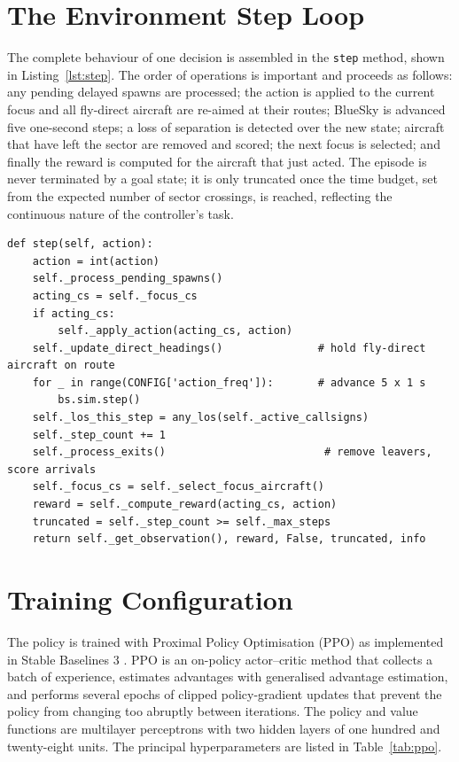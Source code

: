 \section{The Environment Step Loop}
\label{sec:method_step}

The complete behaviour of one decision is assembled in the \texttt{step} method, shown in Listing~\ref{lst:step}. The order of operations is important and proceeds as follows: any pending delayed spawns are processed; the action is applied to the current focus and all fly-direct aircraft are re-aimed at their routes; BlueSky is advanced five one-second steps; a loss of separation is detected over the new state; aircraft that have left the sector are removed and scored; the next focus is selected; and finally the reward is computed for the aircraft that just acted. The episode is never terminated by a goal state; it is only truncated once the time budget, set from the expected number of sector crossings, is reached, reflecting the continuous nature of the controller's task.

\begin{lstlisting}[caption={The environment step (\texttt{env.py}).}, label={lst:step}]
def step(self, action):
    action = int(action)
    self._process_pending_spawns()
    acting_cs = self._focus_cs
    if acting_cs:
        self._apply_action(acting_cs, action)
    self._update_direct_headings()               # hold fly-direct aircraft on route
    for _ in range(CONFIG['action_freq']):       # advance 5 x 1 s
        bs.sim.step()
    self._los_this_step = any_los(self._active_callsigns)
    self._step_count += 1
    self._process_exits()                         # remove leavers, score arrivals
    self._focus_cs = self._select_focus_aircraft()
    reward = self._compute_reward(acting_cs, action)
    truncated = self._step_count >= self._max_steps
    return self._get_observation(), reward, False, truncated, info
\end{lstlisting}


\section{Training Configuration}
\label{sec:method_training}

The policy is trained with Proximal Policy Optimisation (PPO) \cite{DBLP:journals/corr/SchulmanWDRK17} as implemented in Stable Baselines 3 \cite{sb3_algos}. PPO is an on-policy actor--critic method that collects a batch of experience, estimates advantages with generalised advantage estimation, and performs several epochs of clipped policy-gradient updates that prevent the policy from changing too abruptly between iterations. The policy and value functions are multilayer perceptrons with two hidden layers of one hundred and twenty-eight units. The principal hyperparameters are listed in Table~\ref{tab:ppo}.

